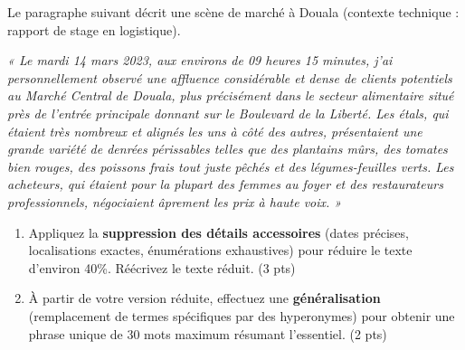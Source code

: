 \documentclass[11pt]{article}
\begin{document}
\begin{exercice}
\label{exo:reduction}
Le paragraphe suivant décrit une scène de marché à Douala (contexte technique : rapport de stage en logistique).

\textit{« Le mardi 14 mars 2023, aux environs de 09 heures 15 minutes, j'ai personnellement observé une affluence considérable et dense de clients potentiels au Marché Central de Douala, plus précisément dans le secteur alimentaire situé près de l'entrée principale donnant sur le Boulevard de la Liberté. Les étals, qui étaient très nombreux et alignés les uns à côté des autres, présentaient une grande variété de denrées périssables telles que des plantains mûrs, des tomates bien rouges, des poissons frais tout juste pêchés et des légumes-feuilles verts. Les acheteurs, qui étaient pour la plupart des femmes au foyer et des restaurateurs professionnels, négociaient âprement les prix à haute voix. »}

\begin{enumerate}
    \item Appliquez la \textbf{suppression des détails accessoires} (dates précises, localisations exactes, énumérations exhaustives) pour réduire le texte d'environ 40\%. Réécrivez le texte réduit. (3 pts)
    \item À partir de votre version réduite, effectuez une \textbf{généralisation} (remplacement de termes spécifiques par des hyperonymes) pour obtenir une phrase unique de 30 mots maximum résumant l'essentiel. (2 pts)
\end{enumerate}
\end{exercice}
\end{document}
